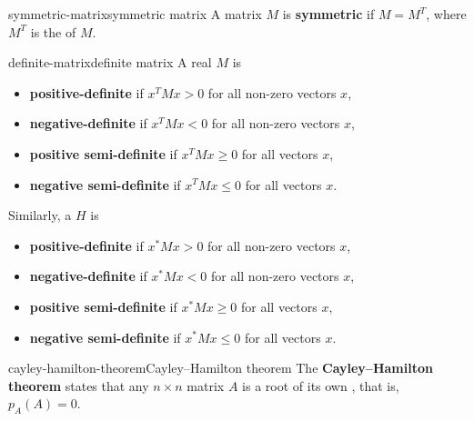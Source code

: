 \begin{topic}{symmetric-matrix}{symmetric matrix}
    A matrix $M$ is \textbf{symmetric} if $M = M^T$, where $M^T$ is the  of $M$.
\end{topic}

\begin{topic}{definite-matrix}{definite matrix}
    A real  $M$ is
    \begin{itemize}
        \item \textbf{positive-definite} if $x^T M x > 0$ for all non-zero vectors $x$,
        \item \textbf{negative-definite} if $x^T M x < 0$ for all non-zero vectors $x$,
        \item \textbf{positive semi-definite} if $x^T M x \ge 0$ for all vectors $x$,
        \item \textbf{negative semi-definite} if $x^T M x \le 0$ for all vectors $x$.
    \end{itemize}
    Similarly, a  $H$ is
    \begin{itemize}
        \item \textbf{positive-definite} if $x^* M x > 0$ for all non-zero vectors $x$,
        \item \textbf{negative-definite} if $x^* M x < 0$ for all non-zero vectors $x$,
        \item \textbf{positive semi-definite} if $x^* M x \ge 0$ for all vectors $x$,
        \item \textbf{negative semi-definite} if $x^* M x \le 0$ for all vectors $x$.
    \end{itemize}
\end{topic}

\begin{topic}{cayley-hamilton-theorem}{Cayley--Hamilton theorem}
    The \textbf{Cayley--Hamilton theorem} states that any $n \times n$ matrix $A$ is a root of its own , that is, $p_A(A) = 0$.
\end{topic}

